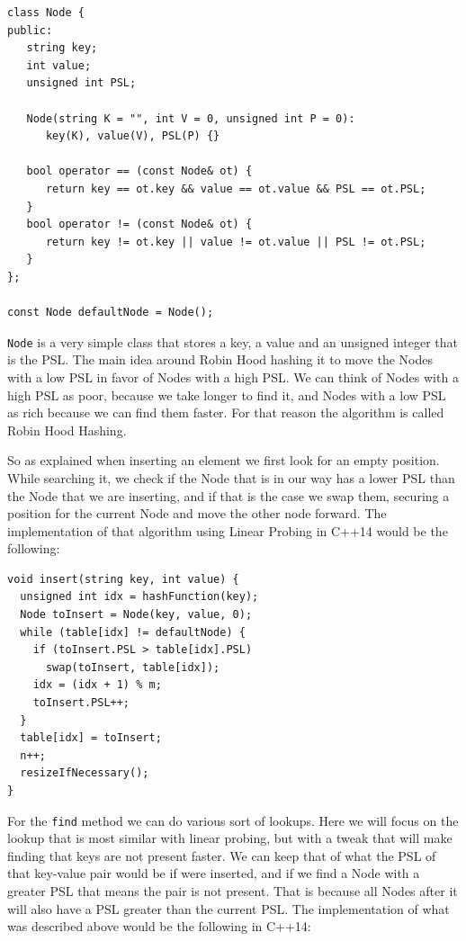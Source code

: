 \begin{lstlisting}
class Node {
public:
   string key;
   int value;
   unsigned int PSL;
   
   Node(string K = "", int V = 0, unsigned int P = 0):
      key(K), value(V), PSL(P) {}

   bool operator == (const Node& ot) {
      return key == ot.key && value == ot.value && PSL == ot.PSL;
   }
   bool operator != (const Node& ot) {
      return key != ot.key || value != ot.value || PSL != ot.PSL;
   }
};

const Node defaultNode = Node();
\end{lstlisting}

\texttt{Node} is a very simple class that stores a key, a value and an unsigned integer that is the PSL. The main idea around Robin Hood hashing it to move the Nodes with a low PSL in favor of Nodes with a high PSL. We can think of Nodes with a high PSL as poor, because we take longer to find it, and Nodes with a low PSL as rich because we can find them faster. For that reason the algorithm is called Robin Hood Hashing.

So as explained when inserting an element we first look for an empty position. While searching it, we check if the Node that is in our way has a lower PSL than the Node that we are inserting, and if that is the case we swap them, securing a position for the current Node and move the other node forward. The implementation of that algorithm using Linear Probing in C++14 would be the following:

\begin{lstlisting}
void insert(string key, int value) {
  unsigned int idx = hashFunction(key);
  Node toInsert = Node(key, value, 0);
  while (table[idx] != defaultNode) {
    if (toInsert.PSL > table[idx].PSL)
      swap(toInsert, table[idx]);         
    idx = (idx + 1) % m;
    toInsert.PSL++;
  }
  table[idx] = toInsert;
  n++;
  resizeIfNecessary();
}
\end{lstlisting}

For the \texttt{find} method we can do various sort of lookups. Here we will focus on the lookup that is most similar with linear probing, but with a tweak that will make finding that keys are not present faster. We can keep that of what the PSL of that key-value pair would be if were inserted, and if we find a Node with a greater PSL that means the pair is not present. That is because all Nodes after it will also have a PSL greater than the current PSL. The implementation of what was described above would be the following in C++14:

